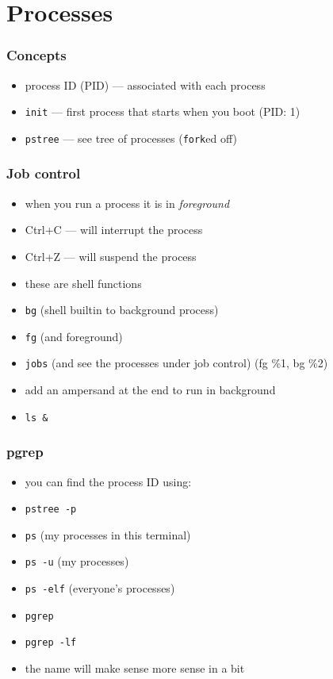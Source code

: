 \documentclass[%
        hyperref={%
                pdfauthor={Zakariyya Mughal},%
                pdfpagemode={None},pdfpagelayout={SinglePage}}%
        xcolor={x11names},%
]{beamer}
\begin{document}
\section{Processes}\frame{\insertsection}
\begin{frame}
	\frametitle{Concepts}
	\begin{itemize}
		\item process ID (PID) --- associated with each
			process
		\item \texttt{init} --- first process that starts when you
			boot (PID: 1)
		\item \texttt{pstree} --- see tree of processes
			(\texttt{fork}ed off)
	\end{itemize}
\end{frame}
\begin{frame}
	\frametitle{Job control}
	\begin{itemize}
		\item when you run a process it is in \emph{foreground}
		\item Ctrl+C --- will interrupt the process
		\item Ctrl+Z --- will suspend the process
		\pause\item these are shell functions
		\pause\item \texttt{bg} (shell builtin to background
			process)
		\pause\item \texttt{fg} (and foreground)
		\pause\item \texttt{jobs} (and see the processes under
			job control) (fg \%1, bg \%2)
		\pause\item add an ampersand at the end to run in
			background
		\item \texttt{ls \&}
	\end{itemize}
\end{frame}
\begin{frame}
	\frametitle{pgrep}
	\begin{itemize}
		\item you can find the process ID using:
		\item \texttt{pstree -p}
		\item \texttt{ps} (my processes in this terminal)
		\item \texttt{ps -u} (my processes)
		\item \texttt{ps -elf} (everyone's processes)
		\pause\item \texttt{pgrep}
		\item \texttt{pgrep -lf}
		\item the name will make sense more sense in a bit
	\end{itemize}
\end{frame}
\end{document}
